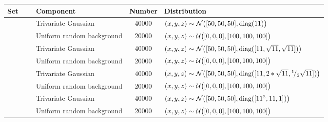

\begin{tabular}{@{}cclS[table-format=+1.1e+1,scientific-notation=true,round-mode=places,round-precision=1]l@{}}
\toprule
Set 			&~						& Component					& {Number} 	& Distribution\\
\midrule
\ferdosiOne 	&\legendComponentOne	& Trivariate Gaussian 		& 40000		& $(x, y, z) \sim \mathcal{N}\big([50, 50, 50], \operatorname{diag}(11)\big)$\\
~ 				&\legendComponentNoise	& Uniform random background	& 20000		& $(x, y, z) \sim \mathcal{U}\big([0, 0, 0], [100, 100, 100]\big)$\\
\hline
\baakmanOne		&\legendComponentOne	& Trivariate Gaussian 		& 40000		& $(x, y, z) \sim \mathcal{N}\big([50, 50, 50], \operatorname{diag}([11, \sqrt{11}, \sqrt{11}])\big)$\\
~ 				&\legendComponentNoise	& Uniform random background	& 20000		& $(x, y, z) \sim \mathcal{U}\big([0, 0, 0], [100, 100, 100]\big)$\\
\hline
\baakmanFour	&\legendComponentOne	& Trivariate Gaussian 		& 40000		& $(x, y, z) \sim \mathcal{N}\big([50, 50, 50], \operatorname{diag}([11, 2 * \sqrt{11}, {}^{1}\!/_{2} \sqrt{11}])\big)$\\
~ 				&\legendComponentNoise	& Uniform random background	& 20000		& $(x, y, z) \sim \mathcal{U}\big([0, 0, 0], [100, 100, 100]\big)$\\
\hline
\baakmanFive	&\legendComponentOne	& Trivariate Gaussian 		& 40000		& $(x, y, z) \sim \mathcal{N}\big([50, 50, 50], \operatorname{diag}([11^2, 11, 1])\big)$\\
~ 				&\legendComponentNoise	& Uniform random background	& 20000		& $(x, y, z) \sim \mathcal{U}\big([0, 0, 0], [100, 100, 100]\big)$\\
\bottomrule
\end{tabular}